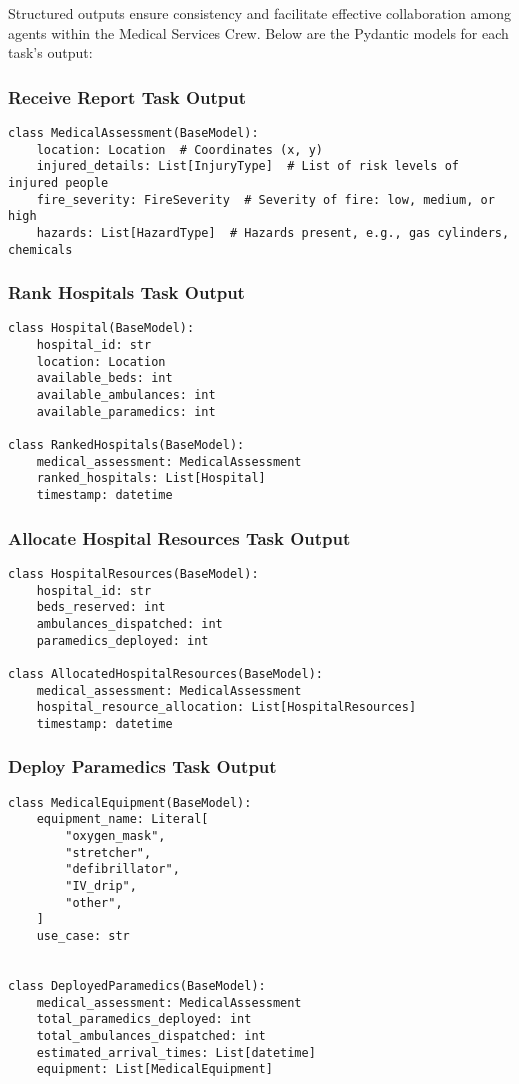 Structured outputs ensure consistency and facilitate effective collaboration among agents within the Medical Services Crew. Below are the Pydantic models for each task's output:

\subsubsection{Receive Report Task Output}
\begin{lstlisting}[caption={Pydantic model for Receive Report Task Output}]
class MedicalAssessment(BaseModel):
    location: Location  # Coordinates (x, y)
    injured_details: List[InjuryType]  # List of risk levels of injured people
    fire_severity: FireSeverity  # Severity of fire: low, medium, or high
    hazards: List[HazardType]  # Hazards present, e.g., gas cylinders, chemicals
\end{lstlisting}

\subsubsection{Rank Hospitals Task Output}
\begin{lstlisting}[caption={Pydantic model for Rank Hospitals Task Output}]
class Hospital(BaseModel):
    hospital_id: str
    location: Location
    available_beds: int
    available_ambulances: int
    available_paramedics: int

class RankedHospitals(BaseModel):
    medical_assessment: MedicalAssessment
    ranked_hospitals: List[Hospital]
    timestamp: datetime
\end{lstlisting}

\subsubsection{Allocate Hospital Resources Task Output}
\begin{lstlisting}[caption={Pydantic model for Allocate Hospital Resources Task Output}]
class HospitalResources(BaseModel):
    hospital_id: str
    beds_reserved: int
    ambulances_dispatched: int
    paramedics_deployed: int

class AllocatedHospitalResources(BaseModel):
    medical_assessment: MedicalAssessment
    hospital_resource_allocation: List[HospitalResources]
    timestamp: datetime
\end{lstlisting}

\subsubsection{Deploy Paramedics Task Output}
\begin{lstlisting}[caption={Pydantic model for Deploy Paramedics Task Output}]
class MedicalEquipment(BaseModel):
    equipment_name: Literal[
        "oxygen_mask",
        "stretcher",
        "defibrillator",
        "IV_drip",
        "other",
    ]
    use_case: str


class DeployedParamedics(BaseModel):
    medical_assessment: MedicalAssessment
    total_paramedics_deployed: int
    total_ambulances_dispatched: int
    estimated_arrival_times: List[datetime]
    equipment: List[MedicalEquipment]
\end{lstlisting}

